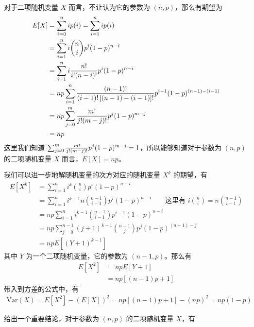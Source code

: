 \documentclass[utf8,a4paper,nofonts,9pt]{ctexbook}
\begin{document}
对于二项随机变量 $X$ 而言，不让认为它的参数为 $(n, p)$，那么有期望为
\begin{align*}
    E[X] & = \sum_{i = 0}^{n} i p(i) = \sum_{i = 1}^{n} i p(i) \\
         & = \sum_{i = 1}^{n} i {n \choose i} p^i (1 - p)^{n - i} \\
         & = \sum_{i = 1}^{n} i {n! \over i! (n - i)!} p^i (1 - p)^{n - i} \\
         & = np \sum_{i = 1}^{n} {(n - 1)! \over (i - 1)! \left[(n - 1) - (i - 1)\right]!} p^{i - 1} (1 - p)^{(n - 1) - (i - 1)} \\
         & = np \sum_{j = 0}^{m} {m! \over j! (m - j)!} p^j (1 - p)^{m - j} \\
         & = np
\end{align*}
这里我们知道 $\sum_{j = 0}^{m} {m! \over j! (m - j)!} p^j (1 - p)^{m - j} = 1$，所以能够知道对于参数为 $(n, p)$ 的二项随机变量 $X$ 而言，$E[X] = np$。

我们可以进一步地解随机变量的次方对应的随机变量 $X^k$ 的期望，有
\begin{align*}
    E[X^k] & = \sum_{i = 1}^{n} i^k {n \choose i} p^i (1 - p)^{n - i} \\
           & = \sum_{i = 1}^{n} i^{k - 1} n {n - 1 \choose i - 1} p^i (1 - p)^{n - i} \qquad \textrm{这里有 $i {n \choose i} = n {n - 1 \choose i - 1}$} \\
           & = np \sum_{i = 1}^{n} i^{k - 1} {n - 1 \choose i - 1} p^{i - 1} (1 - p)^{n - i} \\
           & = np \sum_{j = 0}^{n - 1} (j + 1)^{k - 1} {n - 1 \choose j} p^j (1 - p)^{(n - 1) - j} \\
           & = np E[(Y + 1)^{k - 1}]
\end{align*}
其中 $Y$ 为一个二项随机变量，它的参数为 $(n - 1, p)$。那么有
\begin{align*}
    E[X^2] & = np E[Y + 1] \\
           & = np [(n - 1)p + 1]
\end{align*}
带入到方差的公式中，有
\begin{align*}
    \textrm{Var}(X) = E[X^2] - (E[X])^2 = np [(n - 1)p + 1] - (np)^2 = np (1 - p)
\end{align*}

给出一个重要结论，对于参数为 $(n, p)$ 的二项随机变量 $X$，有
\begin{center}
\end{center}
\end{document}
